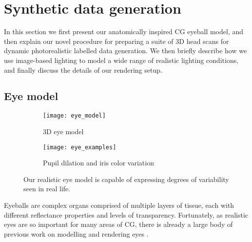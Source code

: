
\section{Synthetic data generation}

In this section we first present our anatomically inspired CG eyeball model, and then explain our novel procedure for preparing a suite of 3D head scans for dynamic photorealistic labelled data generation. We then briefly describe how we use image-based lighting \cite{debevec2002image} to model a wide range of realistic lighting conditions, and finally discuss the details of our rendering setup.


\subsection{Eye model}

\begin{figure}
    \centering
    \begin{subfigure}[t]{0.33\columnwidth}
        \texttt{[image: eye\_model]}
        \caption{3D eye model}
        \label{fig:3d_eye_model}
    \end{subfigure}%
    \hfill
    \begin{subfigure}[t]{0.65\columnwidth}
        \texttt{[image: eye\_examples]}
        \caption{Pupil dilation and iris color variation}
    \end{subfigure}
    \caption{Our realistic eye model is capable of expressing degrees of variability seen in real life.}
    \label{fig:eye_model}
\end{figure}

Eyeballs are complex organs comprised of multiple layers of tissue, each with different reflectance properties and levels of transparency. Fortunately, as realistic eyes are so important for many areas of CG, there is already a large body of previous work on modelling and rendering eyes .


